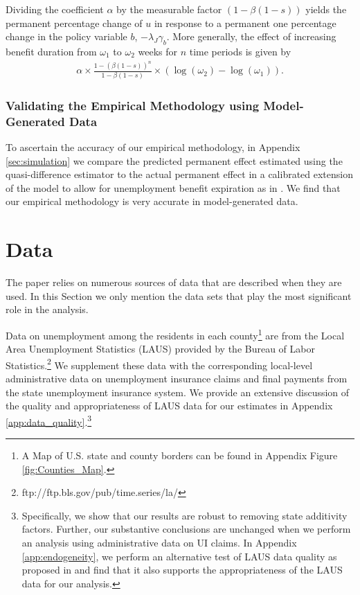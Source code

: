 \documentclass[12pt]{article}
\newcommand{\1}{\mathbf{1}}
\newcommand{\beq}{\begin{eqnarray}}
\newcommand{\eeq}{\end{eqnarray}}
\begin{document}
Dividing the coefficient $\alpha$ by the measurable factor $(1-\beta (1-s))$ yields the permanent percentage change of $u$ in response to a permanent one percentage change in the policy variable $b$, $ -  \lambda_J \gamma_b$. More generally, the effect of increasing benefit duration from $\omega_1$ to $\omega_2$ weeks for $n$ time periods is given by
\beq
\alpha \times\frac{1-(\beta(1-s))^{n}}{1-\beta(1-s)}\times\left(\log(\omega_2)-\log(\omega_1)\right). \label{eq:partial_sum}
\eeq

\subsubsection{Validating the Empirical Methodology using Model-Generated Data}

To ascertain the accuracy of our empirical methodology, in Appendix \ref{sec:simulation} we compare the predicted permanent effect estimated using the quasi-difference estimator to the actual permanent effect in a calibrated extension of the \citet{mortensen+pissarides:94} model to allow for unemployment benefit expiration as in \citet{mitman+rabinovich:15,mitman+rabinovich:24}.  We find that our empirical methodology is very accurate in model-generated data.
 


\section{Data}
\label{sec:data}

The paper relies on numerous sources of data that are described when they are used. In this Section we only mention the data sets that play the most significant role in the analysis.

Data on unemployment among the residents in each county\footnote{A Map of U.S. state and county borders can be found in Appendix Figure \ref{fig:Counties_Map}.}  are from the Local Area Unemployment Statistics (LAUS) provided by the Bureau of Labor Statistics.\footnote{ ftp://ftp.bls.gov/pub/time.series/la/} We supplement these data with the corresponding local-level administrative data on unemployment insurance claims and final payments from the state unemployment insurance system. We provide an extensive discussion of the quality and appropriateness of LAUS data for our estimates in Appendix \ref{app:data_quality}.\footnote{Specifically, we show that our results are robust to removing state additivity factors. Further, our substantive conclusions are unchanged when we perform an analysis using administrative data on UI claims. In Appendix \ref{app:endogeneity}, we perform an alternative test of LAUS data quality as proposed in \citet{hall:13} and find that it also supports the appropriateness of the LAUS data for our analysis.}
\end{document}
